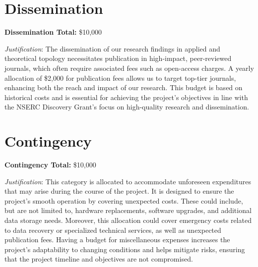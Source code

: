 \documentclass{amsart}
\begin{document}
	\section*{Dissemination}
	\textbf{Dissemination Total:} \$10,000
	\par\noindent\textit{Justification}:
	The dissemination of our research findings in applied and theoretical topology necessitates publication in high-impact, peer-reviewed journals, which often require associated fees such as open-access charges. A yearly allocation of \$2,000 for publication fees allows us to target top-tier journals, enhancing both the reach and impact of our research. This budget is based on historical costs and is essential for achieving the project’s objectives in line with the NSERC Discovery Grant's focus on high-quality research and dissemination.

	\section*{Contingency}
	\textbf{Contingency Total:} \$10,000
	\par\noindent\textit{Justification}:
	This category is allocated to accommodate unforeseen expenditures that may arise during the course of the project. It is designed to ensure the project's smooth operation by covering unexpected costs. These could include, but are not limited to, hardware replacements, software upgrades, and additional data storage needs. Moreover, this allocation could cover emergency costs related to data recovery or specialized technical services, as well as unexpected publication fees. Having a budget for miscellaneous expenses increases the project's adaptability to changing conditions and helps mitigate risks, ensuring that the project timeline and objectives are not compromised.
\end{document}
